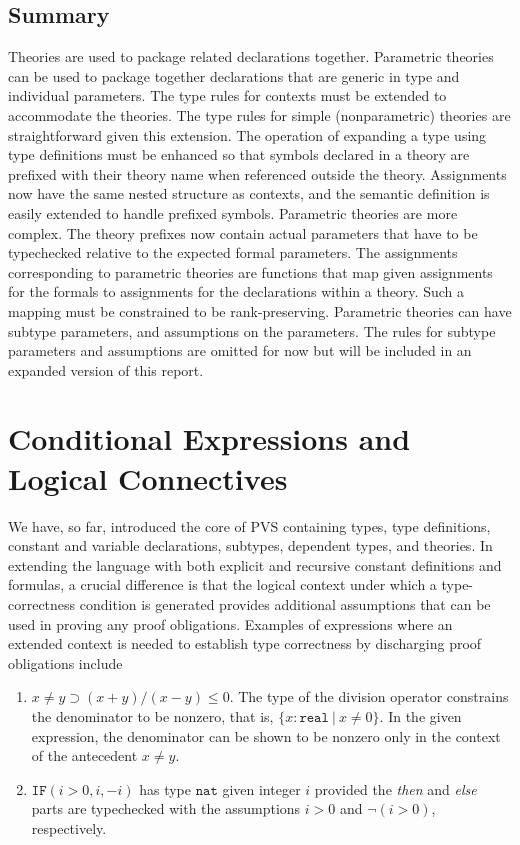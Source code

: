 \documentclass [12pt,twoside]{cslreport}
\newcommand{\ttreal}{\mathtt{real}}
\newcommand{\ttnat}{\mathtt{nat}}
\newcommand{\vbar}{\ |\ }
\begin{document}
\section{Summary}

Theories are used to package related declarations together.  Parametric
theories can be used to package together declarations that are generic in
type and individual parameters.  The type rules for contexts must be
extended to accommodate the theories.  The type rules for simple
(nonparametric) theories are straightforward given this extension.  The
operation of expanding a type using type definitions must be enhanced so
that symbols declared in a theory are prefixed with their theory name when
referenced outside the theory.  Assignments now have the same nested
structure as contexts, and the semantic definition is easily extended to
handle prefixed symbols.  Parametric theories are more complex.  The
theory prefixes now contain actual parameters that have to be typechecked
relative to the expected formal parameters.  The assignments corresponding
to parametric theories are functions that map given assignments for the
formals to assignments for the declarations within a theory.  Such a
mapping must be constrained to be rank-preserving.  Parametric theories
can have subtype parameters, and assumptions on the parameters.  The rules
for subtype parameters and assumptions are omitted for now but will be
included in an expanded version of this report.



\chapter{Conditional Expressions and Logical Connectives}\label{conditionals}

We have, so far, introduced the core of PVS containing types, type
definitions, constant and variable declarations, subtypes, dependent
types, and theories.  In extending the language with
both explicit and recursive constant definitions and formulas,  a crucial
difference  is that the logical context under which a type-correctness
condition is generated provides additional assumptions that can be used in
proving any proof obligations.  Examples of expressions where an
extended context is needed to establish type correctness by discharging
proof obligations include
\begin{enumerate}
\item $x \neq y \supset  (x + y)/(x - y) \leq 0$.  The type of the
division operator constrains the denominator to be nonzero,
that is, $\{x : \ttreal \vbar x \neq 0\}$\@.    
In the given expression,  the denominator
can be shown to be nonzero only in the context of the antecedent $x \neq
y$\@.

\item $\mathtt{IF}(i > 0, i, -i)$ has type $\ttnat$ given integer $i$
provided the {\em then\/} and {\em else\/} parts are typechecked with the
assumptions $i > 0$ and $\neg (i > 0)$, respectively.
\end{enumerate}
\end{document}
